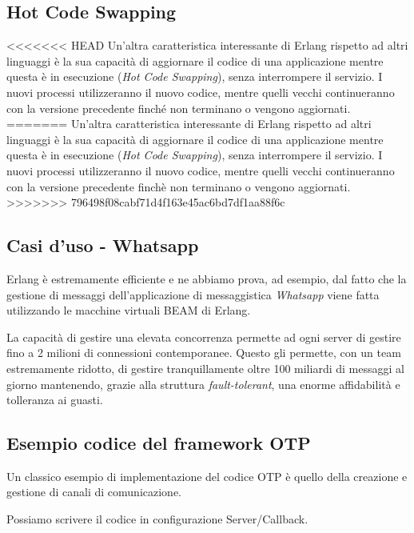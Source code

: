 \subsection{Hot Code Swapping}
<<<<<<< HEAD
Un'altra caratteristica interessante di Erlang rispetto ad altri linguaggi \`e la sua capacit\`a di aggiornare il codice di una applicazione mentre questa \`e in esecuzione (\textit{Hot Code Swapping}), senza interrompere il servizio. I nuovi processi utilizzeranno il nuovo codice, mentre quelli vecchi continueranno con la versione precedente finch\'e non terminano o vengono aggiornati.
=======
Un'altra caratteristica interessante di Erlang rispetto ad altri linguaggi \`e la sua capacit\`a di aggiornare il codice di una applicazione mentre questa \`e in esecuzione (\textit{Hot Code Swapping}), senza interrompere il servizio. I nuovi processi utilizzeranno il nuovo codice, mentre quelli vecchi continueranno con la versione precedente finch\`e non terminano o vengono aggiornati.
>>>>>>> 796498f08cabf71d4f163e45ac6bd7df1aa88f6c


\subsection{Casi d'uso - Whatsapp}
Erlang \`e estremamente efficiente e ne abbiamo prova, ad esempio, dal fatto che la gestione di messaggi dell'applicazione di messaggistica \textit{Whatsapp} viene fatta utilizzando le macchine virtuali BEAM di Erlang.

La capacit\`a di gestire una elevata concorrenza permette ad ogni server di gestire fino a 2 milioni di connessioni contemporanee. Questo gli permette, con un team estremamente ridotto, di gestire tranquillamente oltre 100 miliardi di messaggi al giorno mantenendo, grazie alla struttura \textit{fault-tolerant}, una enorme affidabilit\`a e tolleranza ai guasti.

\subsection{Esempio codice del framework OTP}
Un classico esempio di implementazione del codice OTP \`e quello della creazione e gestione di canali di comunicazione.

Possiamo scrivere il codice in configurazione Server/Callback.
